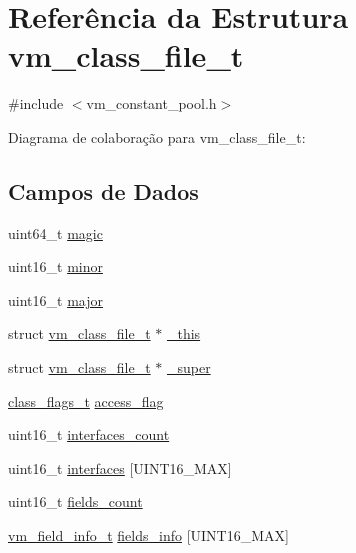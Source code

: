 \hypertarget{structvm__class__file__t}{}\section{Referência da Estrutura vm\+\_\+class\+\_\+file\+\_\+t}
\label{structvm__class__file__t}


{\ttfamily \#include $<$vm\+\_\+constant\+\_\+pool.\+h$>$}



Diagrama de colaboração para vm\+\_\+class\+\_\+file\+\_\+t\+:
\subsection*{Campos de Dados}
\begin{DoxyCompactItemize}
\item 
uint64\+\_\+t \hyperlink{structvm__class__file__t_abbd697aa46868a5c5ab51e2a9a784851}{magic}
\item 
uint16\+\_\+t \hyperlink{structvm__class__file__t_a9f280ce3ae5b6cd9346fd7a09ff29168}{minor}
\item 
uint16\+\_\+t \hyperlink{structvm__class__file__t_a600930655b7237315b72223c48327ea8}{major}
\item 
struct \hyperlink{structvm__class__file__t}{vm\+\_\+class\+\_\+file\+\_\+t} $\ast$ \hyperlink{structvm__class__file__t_a4b74ed82375e295745f93be94c0ee844}{\+\_\+this}
\item 
struct \hyperlink{structvm__class__file__t}{vm\+\_\+class\+\_\+file\+\_\+t} $\ast$ \hyperlink{structvm__class__file__t_a0b23f45633db2488ed97706fecc53d79}{\+\_\+super}
\item 
\hyperlink{vm__constant__pool_8h_a031d95f87ee8ea61a12297cc5e45b645}{class\+\_\+flags\+\_\+t} \hyperlink{structvm__class__file__t_a0ed46c37e2835f9d7d37ed57ce0cef23}{access\+\_\+flag}
\item 
uint16\+\_\+t \hyperlink{structvm__class__file__t_af1e09bc61f7c64d6520042f6e3a8f820}{interfaces\+\_\+count}
\item 
uint16\+\_\+t \hyperlink{structvm__class__file__t_a86362273e30ead60a806fdb4269c57af}{interfaces} \mbox{[}U\+I\+N\+T16\+\_\+\+M\+AX\mbox{]}
\item 
uint16\+\_\+t \hyperlink{structvm__class__file__t_a64d70d8410fc00bd6b5037c68c74f877}{fields\+\_\+count}
\item 
\hyperlink{structvm__field__info__t}{vm\+\_\+field\+\_\+info\+\_\+t} \hyperlink{structvm__class__file__t_a73f2c59fa919290d36f17254b0dc167b}{fields\+\_\+info} \mbox{[}U\+I\+N\+T16\+\_\+\+M\+AX\mbox{]}

\end{DoxyCompactItemize}
